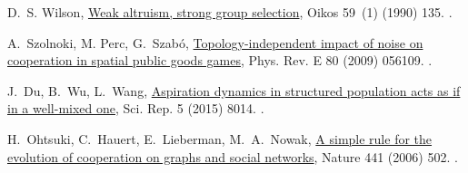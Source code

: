 \documentclass[5p,review]{elsarticle}
\begin{document}
\begin{thebibliography}{10}
D.~S. Wilson, \href{https://www.jstor.org/stable/3545133?origin=crossref}{Weak altruism, strong group selection}, Oikos 59~(1) (1990) 135.
\newblock \href {http://dx.doi.org/10.2307/3545133}
  {}.

A.~Szolnoki, M. Perc, G.~Sza{b\'{o}},
  \href{https://link.aps.org/doi/10.1103/PhysRevE.80.056109}{Topology-independent impact of noise on cooperation in spatial public goods games}, Phys. Rev. E  80 (2009) 056109.
\newblock \href {http://dx.doi.org/10.1103/PhysRevE.80.056109}
  {}.

J.~Du, B.~Wu, L.~Wang, \href{https://www.nature.com/articles/srep08014
}{Aspiration dynamics in structured population acts as if  in a well-mixed one}, Sci. Rep. 5 (2015) 8014.
\newblock \href {http://dx.doi.org/10.1038/srep08014}
  {}.

H.~Ohtsuki, C.~Hauert, E.~Lieberman, M.~A.~Nowak, \href{https://www.nature.com/articles/nature04605}{A simple rule for the evolution of cooperation on graphs and social networks}, Nature 441 (2006) 502.
\newblock \href {https://doi.org/10.1038/nature04605}
    {}.


\end{thebibliography}
\end{document}
